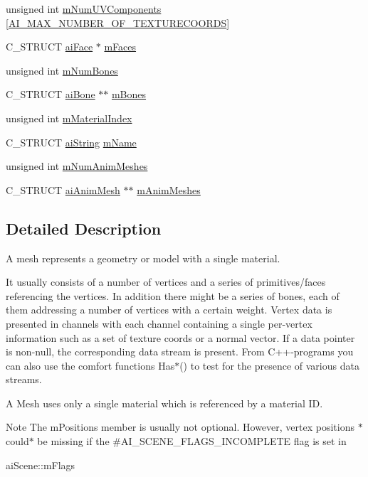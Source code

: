 \begin{DoxyCompactItemize}
\item 
unsigned int \hyperlink{structaiMesh_a635c631a6e66d32989d6b25b2a892d86}{m\-Num\-U\-V\-Components} \mbox{[}\hyperlink{mesh_8h_a335874c5058c7f1e866eb953bf192258}{\-A\-I\-\_\-\-M\-A\-X\-\_\-\-N\-U\-M\-B\-E\-R\-\_\-\-O\-F\-\_\-\-T\-E\-X\-T\-U\-R\-E\-C\-O\-O\-R\-D\-S}\mbox{]}
\item 
\-C\-\_\-\-S\-T\-R\-U\-C\-T \hyperlink{structaiFace}{ai\-Face} $\ast$ \hyperlink{structaiMesh_a5a65fbc7fdea7f8d36f39047425ece07}{m\-Faces}
\item 
unsigned int \hyperlink{structaiMesh_a0f9d5425b6300e32a842a94f943fd79e}{m\-Num\-Bones}
\item 
\-C\-\_\-\-S\-T\-R\-U\-C\-T \hyperlink{structaiBone}{ai\-Bone} $\ast$$\ast$ \hyperlink{structaiMesh_a0c0582a7f45b340b6a33552c53232539}{m\-Bones}
\item 
unsigned int \hyperlink{structaiMesh_aa2807c7ba172115203ed16047ad65f9e}{m\-Material\-Index}
\item 
\-C\-\_\-\-S\-T\-R\-U\-C\-T \hyperlink{structaiString}{ai\-String} \hyperlink{structaiMesh_a8dd9433e0c5b008e3e5aee6c801d3b74}{m\-Name}
\item 
unsigned int \hyperlink{structaiMesh_a1692a300222b32348ae51779df4a697e}{m\-Num\-Anim\-Meshes}
\item 
\-C\-\_\-\-S\-T\-R\-U\-C\-T \hyperlink{structaiAnimMesh}{ai\-Anim\-Mesh} $\ast$$\ast$ \hyperlink{structaiMesh_a5078f7db7e99ed05db89dfa412f0e990}{m\-Anim\-Meshes}
\end{DoxyCompactItemize}


\subsection{\-Detailed \-Description}
\-A mesh represents a geometry or model with a single material. 

\-It usually consists of a number of vertices and a series of primitives/faces referencing the vertices. \-In addition there might be a series of bones, each of them addressing a number of vertices with a certain weight. \-Vertex data is presented in channels with each channel containing a single per-\/vertex information such as a set of texture coords or a normal vector. \-If a data pointer is non-\/null, the corresponding data stream is present. \-From \-C++-\/programs you can also use the comfort functions \-Has$\ast$() to test for the presence of various data streams.

\-A \-Mesh uses only a single material which is referenced by a material \-I\-D. \begin{DoxyNote}{\-Note}
\-The m\-Positions member is usually not optional. \-However, vertex positions $\ast$could$\ast$ be missing if the \#\-A\-I\-\_\-\-S\-C\-E\-N\-E\-\_\-\-F\-L\-A\-G\-S\-\_\-\-I\-N\-C\-O\-M\-P\-L\-E\-T\-E flag is set in 
\begin{DoxyCode}
 aiScene::mFlags
\end{DoxyCode}
 
\end{DoxyNote}


